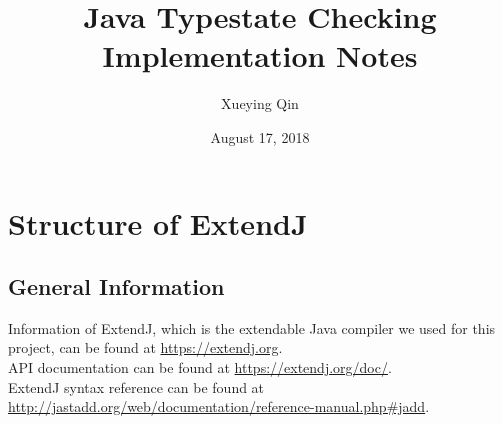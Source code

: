 \documentclass[]{article}
\begin{document}
%




\title{Java Typestate Checking Implementation Notes}
\author{Xueying Qin}
\date{\small August 17, 2018}

\maketitle

\section{Structure of ExtendJ}
\subsection{General Information}
Information of ExtendJ, which is the extendable Java compiler we used for this project, can be found at \url{https://extendj.org}. \\[0.2cm]
API documentation can be found at \url{https://extendj.org/doc/}.\\[0.2cm]
ExtendJ syntax reference can be found at \url{http://jastadd.org/web/documentation/reference-manual.php#jadd}.
\end{document}
